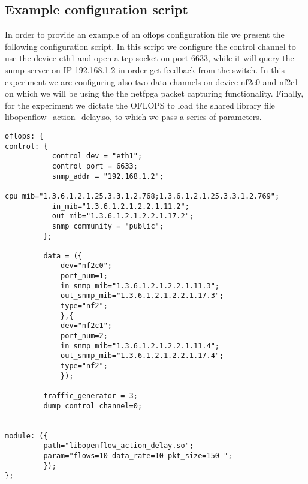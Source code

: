 \documentclass{book}
\begin{document}
\subsection{Example configuration script}

In order to provide an example of an oflops configuration file we present the
following configuration script. In this script we configure the control channel
to use the device eth1 and open a tcp socket on port 6633, while it will query
the snmp server on IP 192.168.1.2 in order get feedback from the switch. In this
experiment we are configuring also two data channels on device nf2c0 and nf2c1
on which we will be using the the netfpga packet capturing functionality.
Finally, for the experiment we dictate the OFLOPS to load the shared library
file libopenflow\_action\_delay.so, to which we pass a series of parameters. 

\lstset{language=Java,numbers=left,frame=single,title=oflops.cfg}
\begin{lstlisting}[frame=single]                % Start your code-block
oflops: {
control: {
           control_dev = "eth1";
           control_port = 6633;
           snmp_addr = "192.168.1.2";
           cpu_mib="1.3.6.1.2.1.25.3.3.1.2.768;1.3.6.1.2.1.25.3.3.1.2.769";  
           in_mib="1.3.6.1.2.1.2.2.1.11.2";
           out_mib="1.3.6.1.2.1.2.2.1.17.2";
           snmp_community = "public";
         };

         data = ({
             dev="nf2c0";
             port_num=1;
             in_snmp_mib="1.3.6.1.2.1.2.2.1.11.3";
             out_snmp_mib="1.3.6.1.2.1.2.2.1.17.3";
             type="nf2";
             },{
             dev="nf2c1";
             port_num=2;
             in_snmp_mib="1.3.6.1.2.1.2.2.1.11.4";
             out_snmp_mib="1.3.6.1.2.1.2.2.1.17.4";
             type="nf2";
             });

         traffic_generator = 3;
         dump_control_channel=0;


module: ({
         path="libopenflow_action_delay.so";
         param="flows=10 data_rate=10 pkt_size=150 ";
         });
};


\end{lstlisting}

% 
% 
% 
\end{document}
